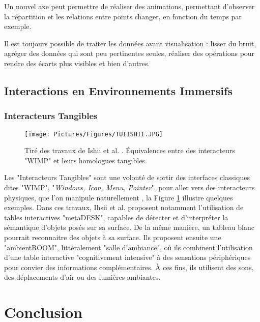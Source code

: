 	
	
	 Un nouvel axe peut permettre de réaliser des animations, permettant d'observer la répartition et les relations entre points changer, en fonction du temps par exemple.
	
	Il est toujours possible de traiter les données avant visualisation : lisser du bruit, agréger des données qui sont peu pertinentes seules, réaliser des opérations pour rendre des écarts plus visibles et bien d'autres.
	
	\subsection{Interactions en Environnements Immersifs}
	
	\subsubsection{Interacteurs Tangibles}
	
		\begin{figure}
			\texttt{[image: Pictures/Figures/TUIISHII.JPG]}
			\caption{Tiré des travaux de Ishii et al. \cite{ishii_tangible_1997}. Équivalences entre des interacteurs "WIMP" et leurs homologues tangibles.}
			\label{TUIEx}
		\end{figure}	
	
			Les "Interacteurs Tangibles" sont une volonté de sortir des interfaces classiques dites "WIMP", "\textit{Windows, Icon, Menu, Pointer}", pour aller vers des interacteurs physiques, que l'on manipule naturellement \cite{ishii_tangible_1997}, la Figure \ref{TUIEx} illustre quelques exemples. Dans ces travaux, Ihsii et al. \cite{ishii_tangible_1997} proposent notamment l'utilisation de tables interactives "metaDESK", capables de détecter et d'interpréter la sémantique d'objets posés sur sa surface. De la même manière, un tableau blanc pourrait reconnaitre des objets à sa surface. Ils proposent ensuite une "ambientROOM", littéralement "salle d'ambiance", où ils combinent l'utilisation d'une table interactive "cognitivement intensive" à des sensations périphériques pour convier des informations complémentaires. À ces fins, ils utilisent des sons, des déplacements d'air ou des lumières ambiantes.
	
	
	
				
	\section*{Conclusion}